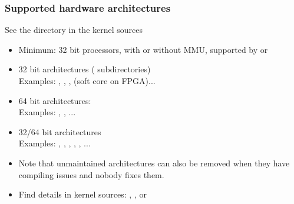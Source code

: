 \begin{frame}
  \frametitle{Supported hardware architectures}
  See the  directory in the kernel sources
  \begin{itemize}
  \item Minimum: 32 bit processors, with or without MMU,
    supported by  or 
  \item 32 bit architectures ( subdirectories)\\
    Examples: , ,
    ,  (soft
        core on FPGA)...
  \item 64 bit architectures:\\
    Examples: , , ...
  \item 32/64 bit architectures\\
    Examples: , , , ,
              , ...
  \item Note that unmaintained architectures can also be removed when they have compiling issues and nobody fixes them.
  \item Find details in kernel sources: ,
    , or 
  \end{itemize}
\end{frame}
